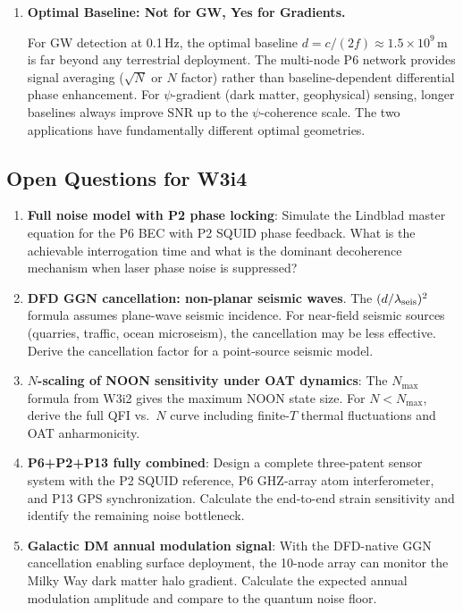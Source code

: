 \documentclass[11pt]{article}
\theoremstyle{definition}
\theoremstyle{remark}
\begin{document}
\begin{enumerate}
\item \textbf{Optimal Baseline: Not for GW, Yes for Gradients.}

For GW detection at 0.1\,Hz, the optimal baseline $d = c/(2f) \approx 1.5
\times10^9$\,m is far beyond any terrestrial deployment. The multi-node
P6 network provides signal averaging ($\sqrt{N}$ or $N$ factor) rather
than baseline-dependent differential phase enhancement. For $\psi$-gradient
(dark matter, geophysical) sensing, longer baselines always improve SNR up
to the $\psi$-coherence scale. The two applications have fundamentally
different optimal geometries.

\end{enumerate}

\subsection{Open Questions for W3i4}

\begin{enumerate}
\item \textbf{Full noise model with P2 phase locking}: Simulate the Lindblad
  master equation for the P6 BEC with P2 SQUID phase feedback. What is the
  achievable interrogation time and what is the dominant decoherence mechanism
  when laser phase noise is suppressed?

\item \textbf{DFD GGN cancellation: non-planar seismic waves}. The
  $(d/\lambda_{\rm seis})^2$ formula assumes plane-wave seismic incidence.
  For near-field seismic sources (quarries, traffic, ocean microseism),
  the cancellation may be less effective. Derive the cancellation factor
  for a point-source seismic model.

\item \textbf{$N$-scaling of NOON sensitivity under OAT dynamics}: The
  $N_{\max}$ formula from W3i2 gives the maximum NOON state size.
  For $N < N_{\max}$, derive the full QFI vs.\ $N$ curve including finite-$T$
  thermal fluctuations and OAT anharmonicity.

\item \textbf{P6+P2+P13 fully combined}: Design a complete three-patent
  sensor system with the P2 SQUID reference, P6 GHZ-array atom interferometer,
  and P13 GPS synchronization. Calculate the end-to-end strain sensitivity and
  identify the remaining noise bottleneck.

\item \textbf{Galactic DM annual modulation signal}: With the DFD-native GGN
  cancellation enabling surface deployment, the 10-node array can monitor the
  Milky Way dark matter halo gradient. Calculate the expected annual modulation
  amplitude and compare to the quantum noise floor.
\end{enumerate}
\end{document}
